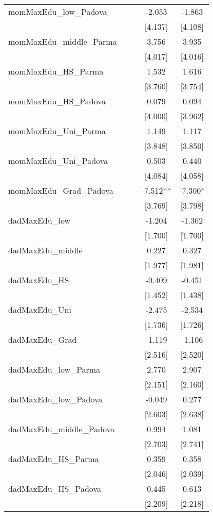 \documentclass[]{article}
\begin{document}
\begin{tabular}{lcccc}
momMaxEdu\_low\_Padova &  &  & -2.053 & -1.863 \\
 &  &  & [4.137] & [4.108] \\
momMaxEdu\_middle\_Parma &  &  & 3.756 & 3.935 \\
 &  &  & [4.017] & [4.016] \\
momMaxEdu\_HS\_Parma &  &  & 1.532 & 1.616 \\
 &  &  & [3.760] & [3.754] \\
momMaxEdu\_HS\_Padova &  &  & 0.079 & 0.094 \\
 &  &  & [4.000] & [3.962] \\
momMaxEdu\_Uni\_Parma &  &  & 1.149 & 1.117 \\
 &  &  & [3.848] & [3.850] \\
momMaxEdu\_Uni\_Padova &  &  & 0.503 & 0.440 \\
 &  &  & [4.084] & [4.058] \\
momMaxEdu\_Grad\_Padova &  &  & -7.512** & -7.300* \\
 &  &  & [3.769] & [3.798] \\
dadMaxEdu\_low &  &  & -1.204 & -1.362 \\
 &  &  & [1.700] & [1.700] \\
dadMaxEdu\_middle &  &  & 0.227 & 0.327 \\
 &  &  & [1.977] & [1.981] \\
dadMaxEdu\_HS &  &  & -0.409 & -0.451 \\
 &  &  & [1.452] & [1.438] \\
dadMaxEdu\_Uni &  &  & -2.475 & -2.534 \\
 &  &  & [1.736] & [1.726] \\
dadMaxEdu\_Grad &  &  & -1.119 & -1.106 \\
 &  &  & [2.516] & [2.520] \\
dadMaxEdu\_low\_Parma &  &  & 2.770 & 2.907 \\
 &  &  & [2.151] & [2.160] \\
dadMaxEdu\_low\_Padova &  &  & -0.049 & 0.277 \\
 &  &  & [2.603] & [2.638] \\
dadMaxEdu\_middle\_Padova &  &  & 0.994 & 1.081 \\
 &  &  & [2.703] & [2.741] \\
dadMaxEdu\_HS\_Parma &  &  & 0.359 & 0.358 \\
 &  &  & [2.046] & [2.039] \\
dadMaxEdu\_HS\_Padova &  &  & 0.445 & 0.613 \\
 &  &  & [2.209] & [2.218] \\

\end{tabular}
\end{document}
